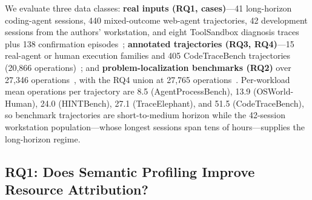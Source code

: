 \documentclass[letterpaper]{article}
\begin{document}
We evaluate three data classes: \textbf{real inputs (RQ1, cases)}---41
long-horizon coding-agent sessions, 440 mixed-outcome web-agent
trajectories, 42 development sessions from the authors' workstation, and
eight ToolSandbox diagnosis traces plus 138 confirmation
episodes~\cite{toolsandbox}; \textbf{annotated trajectories (RQ3, RQ4)}---15 real-agent or
human execution families and 405 CodeTraceBench trajectories (20{,}866
operations)~\cite{weblinx,mind2web,agenttrek,webshop,apibank,toolbench,taubench,
sweagent,androidcontrol,guiodyssey,scalecua,agentrewardbench,safactory,
agentnet,osworldhuman}; and \textbf{problem-localization benchmarks (RQ2)} over
27{,}346 operations~\cite{agentprocessbench,hintbench,traceelephant}, with the
RQ4 union at 27{,}765 operations~\cite{agentrewardbench,safactory,osworldhuman,
agentnet}.
Per-workload mean operations per trajectory are 8.5 (AgentProcessBench), 13.9
(OSWorld-Human), 24.0 (HINTBench), 27.1 (TraceElephant), and 51.5
(CodeTraceBench), so benchmark trajectories are short-to-medium horizon while
the 42-session workstation population---whose longest sessions span tens of
hours---supplies the long-horizon regime.

\subsection{RQ1: Does Semantic Profiling Improve Resource Attribution?}
\end{document}
